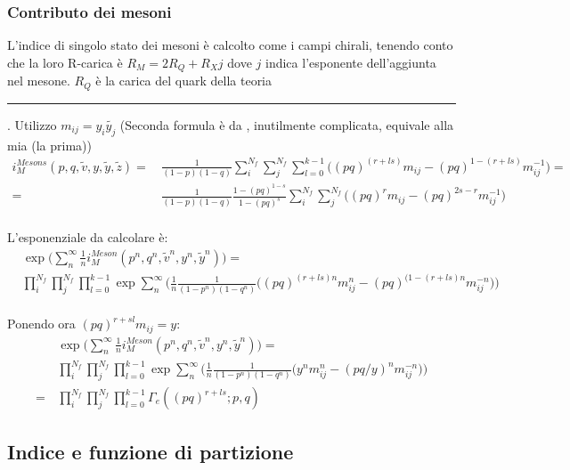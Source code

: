 \documentclass[a4paper,12pt]{article}
\newcommand\Cline[2][red]{{\sbox\MBox{$#2$}%
  \rlap{\usebox\MBox}\color{#1}\rule[-1.2\dp\MBox]{\wd\MBox}{0.5pt}}}
\begin{document}
\subsubsection{Contributo dei mesoni}
L'indice di singolo stato dei mesoni è calcolto come i campi chirali, tenendo conto che la loro R-carica è $ R_M = 2 R_Q + R_X j$ dove $j$ indica l'esponente dell'aggiunta nel mesone. $ R_Q$ è la carica del quark della teoria \Cline[red]{ELETTRICA}.
Utilizzo $m_{ij} = y_i \tilde{y_j}$
(Seconda formula è da \citep{Dolan:2008qi}, inutilmente complicata, equivale alla mia (la prima))
\begin{align*}
 i_M^{Mesons} (p,q, \tilde v, y,\tilde y ,\tilde z) = 
\,  &\frac{1}{(1-p)(1-q)} \sum_i^{N_f} \sum_j^{N_f}   \sum_{l=0}^{k-1}  \bigg( (pq)^{( r+ l s  )}m_{ij}  - (pq)^{1 -( r + l s )}
m_{ij}^{-1} \bigg) = \\ 
= \, & \frac{1}{(1-p)(1-q)}\frac{1 - (pq)^{1-s}}{1 - (pq)^s}  \sum_i^{N_f} \sum_j^{N_f}  \bigg( (pq)^r
m_{ij} - (pq)^{2s-r} 
m_{ij}^{-1} \bigg)\\
\end{align*}

L'esponenziale da calcolare è:
\begin{align*}
& \exp \bigg( \sum_{n}^{\infty} \frac{1}{n} i_M^{Meson} (p^n,q^n, \tilde v^n, y^n,\tilde y^n) \bigg) = \\
& \prod_i^{N_f} \prod_j^{N_f}  \prod_{l=0}^{k-1} \exp \sum_{n}^{\infty} \bigg( \frac{1}{n}  \frac{1}{(1-p^n)(1-q^n)} \bigg( (pq)^{(r + l s )n}
m_{ij}^n - (pq)^{(1-(r + l s )n} 
m_{ij}^{-n} \bigg) \bigg) \\
\end{align*}

Ponendo ora $ (pq)^{r+sl} m_{ij} = y$:
\begin{align*}
& \exp \bigg( \sum_{n}^{\infty} \frac{1}{n} i_M^{Meson} (p^n,q^n, \tilde v^n, y^n,\tilde y^n) \bigg) = \\
& \prod_i^{N_f} \prod_j^{N_f}  \prod_{l=0}^{k-1} \exp \sum_{n}^{\infty} \bigg( \frac{1}{n}  \frac{1}{(1-p^n)(1-q^n)} \bigg( y^n
m_{ij}^n - (pq/y)^{n} 
m_{ij}^{-n} \bigg) \bigg)\\
= \, & \prod_i^{N_f} \prod_j^{N_f}  \prod_{l=0}^{k-1} \Gamma_e ( (pq)^{r + l s} ; p ,q)
\end{align*}

\subsection{Indice e funzione di partizione}
\end{document}
